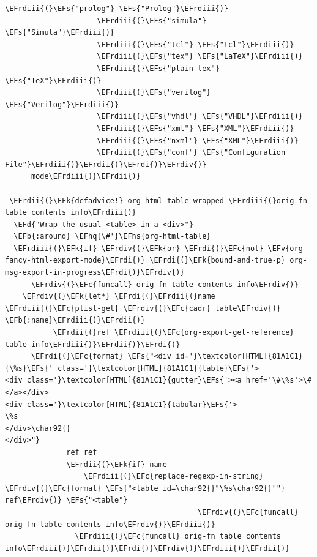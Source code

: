 \documentclass{scrartcl}
\newcommand{\EFk}[1]{\textcolor{EFk}{#1}} %
\newcommand{\EFd}[1]{\textcolor{EFd}{#1}} %
\newcommand{\EFs}[1]{\textcolor{EFs}{#1}} %
\newcommand{\EFb}[1]{\textcolor{EFb}{#1}} %
\newcommand{\EFc}[1]{\textcolor{EFc}{#1}} %
\newcommand{\EFv}[1]{\textcolor{EFv}{#1}} %
\newcommand{\EFhq}[1]{#1} %
\newcommand{\EFhs}[1]{#1} %
\newcommand{\EFrdi}[1]{#1} %
\newcommand{\EFrdii}[1]{#1} %
\newcommand{\EFrdiii}[1]{#1} %
\newcommand{\EFrdiv}[1]{#1} %
\begin{document}
\begin{Code}
\begin{Verbatim}[]
                     \EFrdiii{(}\EFs{"prolog"} \EFs{"Prolog"}\EFrdiii{)}
                     \EFrdiii{(}\EFs{"simula"} \EFs{"Simula"}\EFrdiii{)}
                     \EFrdiii{(}\EFs{"tcl"} \EFs{"tcl"}\EFrdiii{)}
                     \EFrdiii{(}\EFs{"tex"} \EFs{"LaTeX"}\EFrdiii{)}
                     \EFrdiii{(}\EFs{"plain-tex"} \EFs{"TeX"}\EFrdiii{)}
                     \EFrdiii{(}\EFs{"verilog"} \EFs{"Verilog"}\EFrdiii{)}
                     \EFrdiii{(}\EFs{"vhdl"} \EFs{"VHDL"}\EFrdiii{)}
                     \EFrdiii{(}\EFs{"xml"} \EFs{"XML"}\EFrdiii{)}
                     \EFrdiii{(}\EFs{"nxml"} \EFs{"XML"}\EFrdiii{)}
                     \EFrdiii{(}\EFs{"conf"} \EFs{"Configuration File"}\EFrdiii{)}\EFrdii{)}\EFrdi{)}\EFrdiv{)}
      mode\EFrdiii{)}\EFrdii{)}

 \EFrdii{(}\EFk{defadvice!} org-html-table-wrapped \EFrdiii{(}orig-fn table contents info\EFrdiii{)}
  \EFd{"Wrap the usual <table> in a <div>"}
  \EFb{:around} \EFhq{\#'}\EFhs{org-html-table}
  \EFrdiii{(}\EFk{if} \EFrdiv{(}\EFk{or} \EFrdi{(}\EFc{not} \EFv{org-fancy-html-export-mode}\EFrdi{)} \EFrdi{(}\EFk{bound-and-true-p} org-msg-export-in-progress\EFrdi{)}\EFrdiv{)}
      \EFrdiv{(}\EFc{funcall} orig-fn table contents info\EFrdiv{)}
    \EFrdiv{(}\EFk{let*} \EFrdi{(}\EFrdii{(}name \EFrdiii{(}\EFc{plist-get} \EFrdiv{(}\EFc{cadr} table\EFrdiv{)} \EFb{:name}\EFrdiii{)}\EFrdii{)}
           \EFrdii{(}ref \EFrdiii{(}\EFc{org-export-get-reference} table info\EFrdiii{)}\EFrdii{)}\EFrdi{)}
      \EFrdi{(}\EFc{format} \EFs{"<div id='}\textcolor[HTML]{81A1C1}{\%s}\EFs{' class='}\textcolor[HTML]{81A1C1}{table}\EFs{'>
<div class='}\textcolor[HTML]{81A1C1}{gutter}\EFs{'><a href='\#\%s'>\#</a></div>
<div class='}\textcolor[HTML]{81A1C1}{tabular}\EFs{'>
\%s
</div>\char92{}
</div>"}
              ref ref
              \EFrdii{(}\EFk{if} name
                  \EFrdiii{(}\EFc{replace-regexp-in-string} \EFrdiv{(}\EFc{format} \EFs{"<table id=\char92{}"\%s\char92{}""} ref\EFrdiv{)} \EFs{"<table"}
                                            \EFrdiv{(}\EFc{funcall} orig-fn table contents info\EFrdiv{)}\EFrdiii{)}
                \EFrdiii{(}\EFc{funcall} orig-fn table contents info\EFrdiii{)}\EFrdii{)}\EFrdi{)}\EFrdiv{)}\EFrdiii{)}\EFrdii{)}



\end{Verbatim}
\end{Code}
\end{document}
